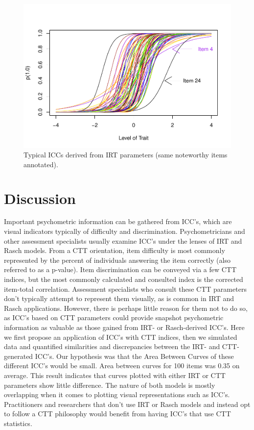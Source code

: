 \documentclass[
  jou]{apa6}
\begin{document}
\begin{figure}
\centering
\includegraphics{ICC_project_files/figure-latex/irtcurves-1.pdf}
\caption{\label{fig:irtcurves}Typical ICCs derived from IRT parameters (same noteworthy items annotated).}
\end{figure}

\hypertarget{discussion}{%
\section{Discussion}\label{discussion}}

Important psychometric information can be gathered from ICC's, which are visual indicators typically of difficulty and discrimination. Psychometricians and other assessment specialists usually examine ICC's under the lenses of IRT and Rasch models. From a CTT orientation, item difficulty is most commonly represented by the percent of individuals answering the item correctly (also referred to as a p-value). Item discrimination can be conveyed via a few CTT indices, but the most commonly calculated and consulted index is the corrected item-total correlation. Assessment specialists who consult these CTT parameters don't typically attempt to represent them visually, as is common in IRT and Rasch applications. However, there is perhaps little reason for them not to do so, as ICC's based on CTT parameters could provide snapshot psychometric information as valuable as those gained from IRT- or Rasch-derived ICC's. Here we first propose an application of ICC's with CTT indices, then we simulated data and quantified similarities and discrepancies between the IRT- and CTT-generated ICC's. Our hypothesis was that the Area Between Curves of these different ICC's would be small. Area between curves for 100 items was 0.35 on average. This result indicates that curves plotted with either IRT or CTT parameters show little difference. The nature of both models is mostly overlapping when it comes to plotting visual representations such as ICC's. Practitioners and researchers that don't use IRT or Rasch models and instead opt to follow a CTT philosophy would benefit from having ICC's that use CTT statistics.
\end{document}
